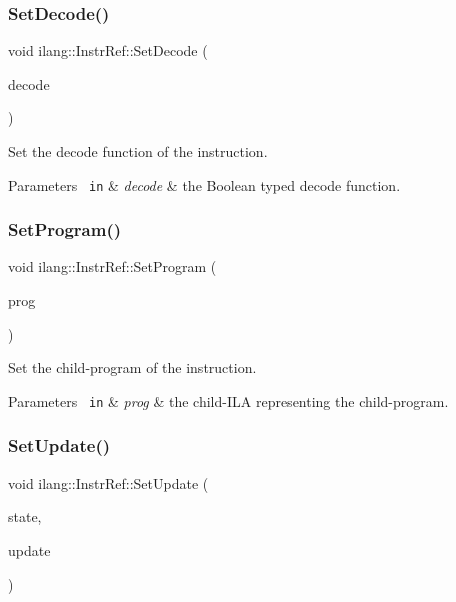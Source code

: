 \subsubsection{\texorpdfstring{Set\+Decode()}{SetDecode()}}
{\footnotesize\ttfamily void ilang\+::\+Instr\+Ref\+::\+Set\+Decode (\begin{DoxyParamCaption}\item[{const \mbox{\hyperlink{classilang_1_1_expr_ref}{Expr\+Ref}} \&}]{decode }\end{DoxyParamCaption})}



Set the decode function of the instruction. 


\begin{DoxyParams}[1]{Parameters}
\mbox{\texttt{ in}}  & {\em decode} & the Boolean typed decode function. \\
\hline
\end{DoxyParams}
\mbox{\label{classilang_1_1_instr_ref_a6ef8193b5d81b1d93f34529bf9fce9bb}} 
\subsubsection{\texorpdfstring{Set\+Program()}{SetProgram()}}
{\footnotesize\ttfamily void ilang\+::\+Instr\+Ref\+::\+Set\+Program (\begin{DoxyParamCaption}\item[{const \mbox{\hyperlink{classilang_1_1_ila}{Ila}} \&}]{prog }\end{DoxyParamCaption})}



Set the child-\/program of the instruction. 


\begin{DoxyParams}[1]{Parameters}
\mbox{\texttt{ in}}  & {\em prog} & the child-\/\+I\+LA representing the child-\/program. \\
\hline
\end{DoxyParams}
\mbox{\label{classilang_1_1_instr_ref_af71d7eb364db7f78451a8cf4f268840c}} 
\subsubsection{\texorpdfstring{Set\+Update()}{SetUpdate()}}
{\footnotesize\ttfamily void ilang\+::\+Instr\+Ref\+::\+Set\+Update (\begin{DoxyParamCaption}\item[{const \mbox{\hyperlink{classilang_1_1_expr_ref}{Expr\+Ref}} \&}]{state,  }\item[{const \mbox{\hyperlink{classilang_1_1_expr_ref}{Expr\+Ref}} \&}]{update }\end{DoxyParamCaption})}



